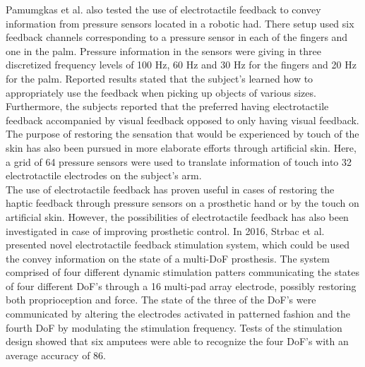 Pamumgkas et al.\cite{Pamungkas2015} also tested the use of electrotactile feedback to convey information from pressure sensors located in a robotic had. There setup used six feedback channels corresponding to a pressure sensor in each of the fingers and one in the palm. Pressure information in the sensors were giving in three discretized frequency levels of 100 Hz, 60 Hz and 30 Hz for the fingers and 20 Hz for the palm. Reported results stated that the subject's learned how to appropriately use the feedback when picking up objects of various sizes. Furthermore, the subjects reported that the preferred having electrotactile feedback accompanied by visual feedback opposed to only having visual feedback. \cite{Pamungkas2015} 
The purpose of restoring the sensation that would be experienced by touch of the skin has also been pursued in more elaborate efforts through artificial skin. Here, a grid of 64 pressure sensors were used to translate information of touch into 32 electrotactile electrodes on the subject's arm. \cite{Hartmann2014,Franceschi2015}  \\
The use of electrotactile feedback has proven useful in cases of restoring the haptic feedback through pressure sensors on a prosthetic hand or by the touch on artificial skin. However, the possibilities of electrotactile feedback has also been investigated in case of improving prosthetic control. In 2016, Strbac et al. \cite{Strbac2016} presented novel electrotactile feedback stimulation system, which could be used the convey information on the state of a multi-DoF prosthesis. The system comprised of four different dynamic stimulation patters communicating the states of four different DoF's through a 16 multi-pad array electrode, possibly restoring both proprioception and force. The state of the three of the DoF's were communicated by altering the electrodes activated in patterned fashion and the fourth DoF by modulating the stimulation frequency. Tests of the stimulation design showed that six amputees were able to recognize the four DoF's with an average accuracy of 86\percent.  \cite{Strbac2016}   




 
        



